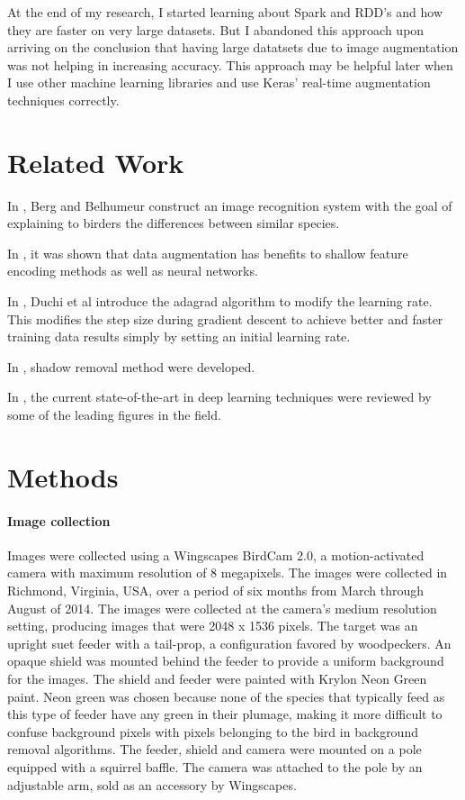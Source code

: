 \documentclass[11pt,twocolumn]{article}
\begin{document}
At the end of my research, I started learning about Spark and RDD's and how they are faster on very large datasets. But I abandoned this approach upon arriving on the conclusion that having large datatsets due to image augmentation was not helping in increasing accuracy. This approach may be helpful later when I use other machine learning libraries and use Keras' real-time augmentation techniques correctly.

\section{Related Work}


In \cite{BIRDID:Berg2013}, Berg and Belhumeur construct an image recognition
system with the goal of explaining to birders the differences between
similar species.

In \cite{BIRDID:Chatfield2014}, it was shown that data augmentation has benefits
to shallow feature encoding methods as well as neural networks. 

In \cite{BIRDID:duchi2011adaptive}, Duchi et al introduce the adagrad algorithm to 
modify the learning rate. This modifies the step size during gradient descent to achieve
better and faster training data results simply by setting an initial learning rate.

In \cite{BIRDID:fredembach2006}, shadow removal method were developed.

In \cite{BIRDID:Lecun2015}, the current state-of-the-art in deep learning techniques were 
reviewed by some of the leading figures in the field.
 

\section{Methods}
\label{sec:methods}

\paragraph{Image collection}

Images were collected using a Wingscapes BirdCam 2.0, a motion-activated
camera with maximum resolution of 8 megapixels. The images were collected
in Richmond, Virginia, USA, over a period of six months from
March through August of 2014. The images
were collected at the camera's medium resolution setting, producing images
that were 2048 x 1536 pixels. The target was an upright suet feeder with a
tail-prop, a configuration favored by woodpeckers. An opaque shield
was mounted behind the feeder to provide a uniform background for the
images. The shield and feeder were painted with Krylon Neon Green paint.
Neon green was chosen because none of the species that typically feed
as this type of feeder have any green in their plumage, making it more
difficult to confuse background pixels with pixels belonging to the
bird in background removal algorithms. The feeder, shield and camera
were mounted on a pole equipped with a squirrel baffle. The camera was
attached to the pole by an adjustable arm, sold as an accessory by
Wingscapes.
\end{document}
